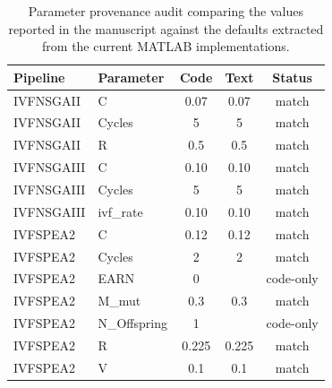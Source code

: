 \begin{table}[t]
\centering
\caption{Parameter provenance audit comparing the values reported in the manuscript against the defaults extracted from the current MATLAB implementations.}
\label{tab:hosts_parameter_provenance}
\scriptsize
\begin{tabular}{llccc}
\toprule
Pipeline & Parameter & Code & Text & Status \\
\midrule
IVFNSGAII & C & 0.07 & 0.07 & match \\
IVFNSGAII & Cycles & 5 & 5 & match \\
IVFNSGAII & R & 0.5 & 0.5 & match \\
IVFNSGAIII & C & 0.10 & 0.10 & match \\
IVFNSGAIII & Cycles & 5 & 5 & match \\
IVFNSGAIII & ivf_rate & 0.10 & 0.10 & match \\
IVFSPEA2 & C & 0.12 & 0.12 & match \\
IVFSPEA2 & Cycles & 2 & 2 & match \\
IVFSPEA2 & EARN & 0 &  & code-only \\
IVFSPEA2 & M_mut & 0.3 & 0.3 & match \\
IVFSPEA2 & N_Offspring & 1 &  & code-only \\
IVFSPEA2 & R & 0.225 & 0.225 & match \\
IVFSPEA2 & V & 0.1 & 0.1 & match \\
\bottomrule
\end{tabular}
\end{table}
